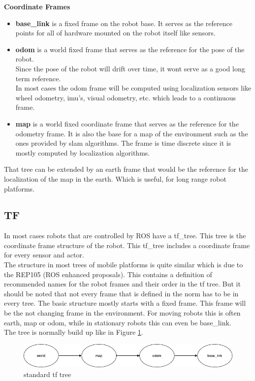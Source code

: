 	\textbf{Coordinate Frames}
	\begin{itemize}
		\item \textbf{base\_link} is a fixed frame on the robot base. It serves as the reference points for all of hardware mounted on the robot itself like sensors.
		\item \textbf{odom} is a world fixed frame that serves as the reference for the pose of the robot.\\ Since the pose of the robot will drift over time, it wont serve as a good long term reference.\\In most cases the odom frame will be computed using localization sensors like wheel odometry, imu's, visual odometry, etc. which leads to a continuous frame.
		\item \textbf{map} is a world fixed coordinate frame that serves as the reference for the odometry frame. It is also the base for a map of the environment such as the ones provided by slam algorithms. The frame is time discrete since it is mostly computed by localization algorithms.
	\end{itemize}
	
	That tree can be extended by an earth frame that would be the reference for the localization of the map in the earth. Which is useful, for long range robot platforms.\cite{REP105}
	
	
	
\subsection{TF}
In most cases robots that are controlled by ROS have a tf\_tree. This tree is the coordinate frame structure of the robot. This tf\_tree includes a coordinate frame for every sensor and actor.\\
 The structure in most trees of mobile platforms is quite similar which is due to the REP105 (ROS enhanced proposals). This contains a definition of recommended names for the robot frames and their order in the tf tree. But it should be noted that not every frame that is defined in the norm has to be in every tree. The basic structure mostly starts with a fixed frame. This frame will be the not changing frame in the environment. For moving robots this is often earth, map or odom, while in stationary robots this can even be base\_link.\\
 

The tree is normally build up like in Figure \ref{stdtftree}.


\begin{figure}[H]
	\includegraphics[width=\textwidth]{Pictures/tf standard tree}
	\caption{standard tf tree}
	\label{stdtftree}
\end{figure}


